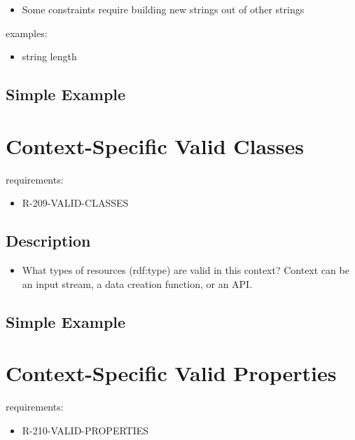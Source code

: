 \documentclass{llncs}
\begin{document}
\begin{itemize}
	\item Some constraints require building new strings out of other strings
\end{itemize}

examples:

\begin{itemize}
	\item string length
\end{itemize}

\subsection{Simple Example}





\section{Context-Specific Valid Classes}

requirements:

\begin{itemize}
	\item R-209-VALID-CLASSES
\end{itemize}

\subsection{Description}

\begin{itemize}
	\item What types of resources (rdf:type) are valid in this context? Context can be an input stream, a data creation function, or an API.
\end{itemize}

\subsection{Simple Example}



\section{Context-Specific Valid Properties}

requirements:

\begin{itemize}
	\item R-210-VALID-PROPERTIES
\end{itemize}
\end{document}
